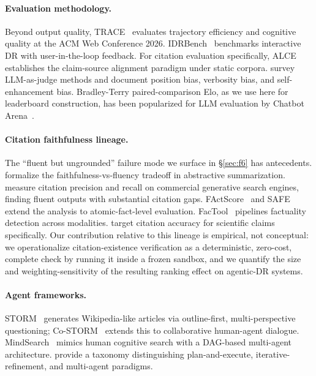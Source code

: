 \documentclass{article}
\begin{document}
\paragraph{Evaluation methodology.} Beyond output quality, TRACE~\citep{trace2026} evaluates trajectory efficiency and cognitive quality at the ACM Web Conference 2026. IDRBench~\citep{idrbench2026} benchmarks interactive DR with user-in-the-loop feedback. For citation evaluation specifically, ALCE~\citep{alce2023} establishes the claim-source alignment paradigm under static corpora. \citet{llmjudge2024} survey LLM-as-judge methods and document position bias, verbosity bias, and self-enhancement bias. Bradley-Terry paired-comparison Elo, as we use here for leaderboard construction, has been popularized for LLM evaluation by Chatbot Arena~\citep{chatbot_arena2024}.

\paragraph{Citation faithfulness lineage.} The ``fluent but ungrounded'' failure mode we surface in \S\ref{sec:f6} has antecedents.  \citet{maynez2020faithfulness} formalize the faithfulness-vs-fluency tradeoff in abstractive summarization. \citet{liu2023verifiability} measure citation precision and recall on commercial generative search engines, finding fluent outputs with substantial citation gaps. FActScore~\citep{factscore2023} and SAFE~\citep{safe2024} extend the analysis to atomic-fact-level evaluation. FacTool~\citep{chern2023factool} pipelines factuality detection across modalities. \citet{citeme2024} target citation accuracy for scientific claims specifically. Our contribution relative to this lineage is empirical, not conceptual: we operationalize citation-existence verification as a deterministic, zero-cost, complete check by running it inside a frozen sandbox, and we quantify the size and weighting-sensitivity of the resulting ranking effect on agentic-DR systems.

\paragraph{Agent frameworks.} STORM~\citep{storm2024} generates Wikipedia-like articles via outline-first, multi-perspective questioning; Co-STORM~\citep{costorm2024} extends this to collaborative human-agent dialogue. MindSearch~\citep{mindsearch2025} mimics human cognitive search with a DAG-based multi-agent architecture. \citet{drsurvey2025} provide a taxonomy distinguishing plan-and-execute, iterative-refinement, and multi-agent paradigms.
\end{document}

